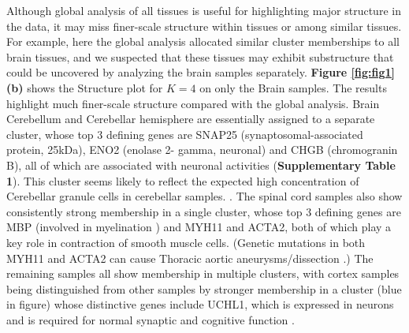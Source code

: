 
Although global analysis of all tissues is useful for highlighting major structure in the data, it may miss finer-scale structure within tissues or among similar tissues. For example, here the global analysis allocated similar cluster memberships to all brain tissues,  and we suspected that these tissues may exhibit substructure that could be uncovered by analyzing the brain samples separately.  \textbf{Figure \ref{fig:fig1}(b)} shows the Structure plot for $K=4$ on only the Brain samples. The results highlight much finer-scale structure compared with the global analysis. Brain Cerebellum and Cerebellar hemisphere are essentially assigned to a separate cluster, whose top 3 defining genes are SNAP25 (synaptosomal-associated protein, 25kDa), ENO2 (enolase 2- gamma, neuronal) and CHGB (chromogranin B),  all of which are associated with neuronal activities (\textbf{Supplementary Table 1}). This cluster seems likely to reflect the expected high concentration of Cerebellar granule cells in cerebellar samples.
. %
The spinal cord samples also show consistently strong membership in a single cluster, whose top 3 defining genes are MBP  (involved in myelination \cite{Hu2016}) and MYH11 and ACTA2, both of which play a key role in contraction of smooth muscle cells. (Genetic mutations in both MYH11 and ACTA2 can cause Thoracic aortic aneurysms/dissection \cite{Renard2013}.) The remaining samples all show membership in multiple clusters, with cortex samples being distinguished from other samples by stronger membership in a cluster (blue in figure) whose distinctive genes include UCHL1, which is expressed in neurons and is required for normal synaptic and cognitive function \cite{Gong2006}.


